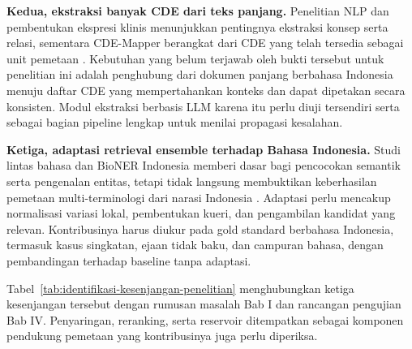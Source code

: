 \textbf{Kedua, ekstraksi banyak CDE dari teks panjang.} Penelitian NLP dan pembentukan ekspresi klinis menunjukkan pentingnya ekstraksi konsep serta relasi, sementara CDE-Mapper berangkat dari CDE yang telah tersedia sebagai unit pemetaan \citep{hong_developing_2019,peterson_automating_2020,gilani_cde-mapper_2025}. Kebutuhan yang belum terjawab oleh bukti tersebut untuk penelitian ini adalah penghubung dari dokumen panjang berbahasa Indonesia menuju daftar CDE yang mempertahankan konteks dan dapat dipetakan secara konsisten. Modul ekstraksi berbasis LLM karena itu perlu diuji tersendiri serta sebagai bagian pipeline lengkap untuk menilai propagasi kesalahan.

\textbf{Ketiga, adaptasi retrieval ensemble terhadap Bahasa Indonesia.} Studi lintas bahasa dan BioNER Indonesia memberi dasar bagi pencocokan semantik serta pengenalan entitas, tetapi tidak langsung membuktikan keberhasilan pemetaan multi-terminologi dari narasi Indonesia \citep{chen_automatic_2022,purwitasari_comparison_2023}. Adaptasi perlu mencakup normalisasi variasi lokal, pembentukan kueri, dan pengambilan kandidat yang relevan. Kontribusinya harus diukur pada gold standard berbahasa Indonesia, termasuk kasus singkatan, ejaan tidak baku, dan campuran bahasa, dengan pembandingan terhadap baseline tanpa adaptasi.

Tabel~\ref{tab:identifikasi-kesenjangan-penelitian} menghubungkan ketiga kesenjangan tersebut dengan rumusan masalah Bab I dan rancangan pengujian Bab IV. Penyaringan, reranking, serta reservoir ditempatkan sebagai komponen pendukung pemetaan yang kontribusinya juga perlu diperiksa.

